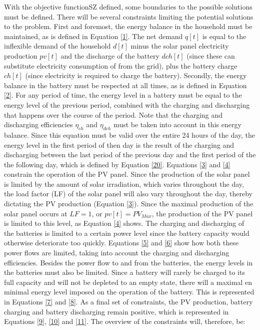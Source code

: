 With the objective functionSZ defined, some boundaries to the possible solutions must be defined. There will be several constraints limiting the potential solutions to the problem. First and foremost, the energy balance in the household must be maintained, as is defined in Equation \ref{1}. The net demand $q[t]$ is equal to the inflexible demand of the household $d[t]$ minus the solar panel electricity production $pv[t]$ and the discharge of the battery $dch[t]$ (since these can substitute electricity consumption of from the grid), plus the battery charge $ch[t]$ (since electricity is required to charge the battery). Secondly, the energy balance in the battery must be respected at all times, as is defined in Equation \ref{2}. For any period of time, the energy level in a battery must be equal to the energy level of the previous period, combined with the charging and discharging that happens over the course of the period. Note that the charging and discharging efficiencies $\eta_{ch}$ and $\eta_{dch}$ must be taken into account in this energy balance. Since this equation must be valid over the entire 24 hours of the day, the energy level in the first period of then day is the result of the charging and discharging between the last period of the previous day and the first period of the the following day, which is defined by Equation \ref{20}. Equations \ref{3} and \ref{4} constrain the operation of the PV panel. Since the production of the solar panel is limited by the amount of solar irradiation, which varies throughout the day, the load factor (LF) of the solar panel will also vary throughout the day, thereby dictating the PV production (Equation \ref{3}). Since the maximal production of the solar panel occurs at $LF = 1$, or $pv[t] = PV_{Max}$, the production of the PV panel is limited to this level, as Equation \ref{4} shows. The charging and discharging of the batteries is limited to a certain power level since the battery capacity would otherwise deteriorate too quickly. Equations \ref{5} and \ref{6} show how both these power flows are limited, taking into account the charging and discharging efficiencies. Besides the power flow to and from the batteries, the energy levels in the batteries must also be limited. Since a battery will rarely be charged to its full capacity and will not be depleted to an empty state, there will a maximal en minimal energy level imposed on the operation of the battery. This is represented in Equations \ref{7} and \ref{8}. As a final set of constraints, the PV production, battery charging and battery discharging remain positive, which is represented in Equations \ref{9}, \ref{10} and \ref{11}. The overview of the constraints will, therefore, be:
